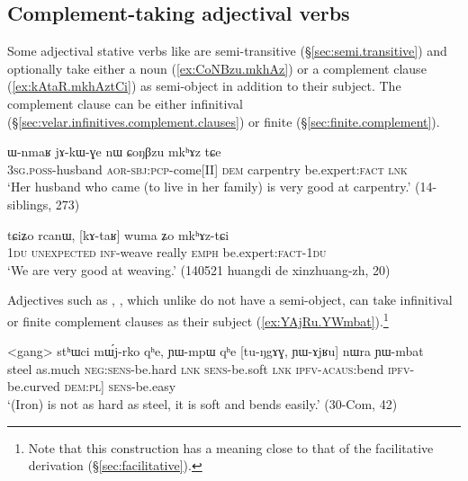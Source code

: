 \subsection{Complement-taking adjectival verbs} \label{sec:adjective.complement}
Some adjectival stative verbs like  are semi-transitive (§\ref{sec:semi.transitive}) and optionally take either a noun (\ref{ex:CoNBzu.mkhAz}) or a complement clause (\ref{ex:kAtaR.mkhAztCi}) as semi-object in addition to their subject. The complement clause can be either infinitival (§\ref{sec:velar.infinitives.complement.clauses}) or finite (§\ref{sec:finite.complement}).

\begin{exe}
\ex \label{ex:CoNBzu.mkhAz}
\gll ɯ-nmaʁ jɤ-kɯ-ɣe nɯ ɕoŋβzu mkʰɤz tɕe \\
\textsc{3sg}.\textsc{poss}-husband \textsc{aor}-\textsc{sbj}:\textsc{pcp}-come[II] \textsc{dem} carpentry be.expert:\textsc{fact} \textsc{lnk} \\
\glt `Her husband who came (to live in her family) is very good at carpentry.' (14-siblings, 273)
\end{exe}

\begin{exe}
\ex \label{ex:kAtaR.mkhAztCi}
\gll tɕiʑo rcanɯ, [kɤ-taʁ] wuma ʑo mkʰɤz-tɕi 	 \\
\textsc{1du}  \textsc{unexpected} \textsc{inf}-weave really \textsc{emph} be.expert:\textsc{fact}-\textsc{1du} \\
\glt `We are very good at weaving.' (140521 huangdi de xinzhuang-zh, 20)
\end{exe}


Adjectives such as , , which unlike  do not have a semi-object, can take infinitival or finite complement clauses as their subject (\ref{ex:YAjRu.YWmbat}).\footnote{Note that this construction has a meaning close to that of the facilitative  derivation (§\ref{sec:facilitative}). }

\begin{exe}
\ex \label{ex:YAjRu.YWmbat}
\gll <gang> stʰɯci mɯ́j-rko qʰe, ɲɯ-mpɯ qʰe [tu-ŋgɤɣ, ɲɯ-ɤjʁu] nɯra ɲɯ-mbat \\
steel as.much \textsc{neg}:\textsc{sens}-be.hard \textsc{lnk} \textsc{sens}-be.soft \textsc{lnk} \textsc{ipfv}-\textsc{acaus}:bend \textsc{ipfv}-be.curved  \textsc{dem}:\textsc{pl}] \textsc{sens}-be.easy \\
\glt `(Iron) is not as hard as steel, it is soft and bends easily.' (30-Com, 42)
\end{exe}

